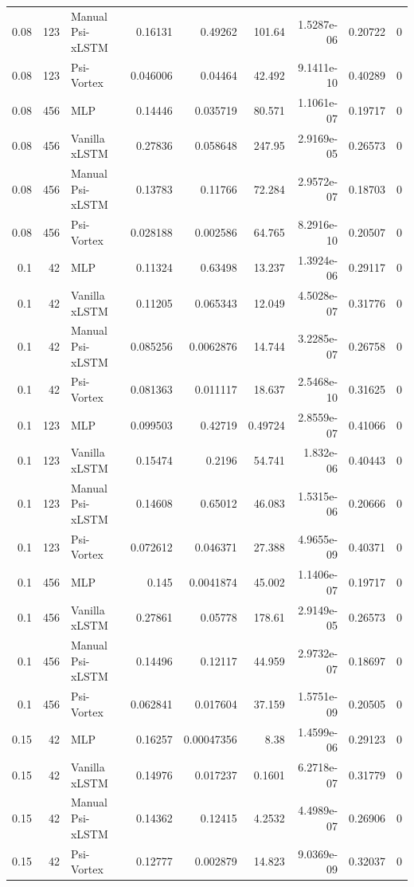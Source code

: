 \begin{tabular}{rrlrrrrrr}
0.08 & 123 & Manual Psi-xLSTM & 0.16131 & 0.49262 & 101.64 & 1.5287e-06 & 0.20722 & 0 \\
0.08 & 123 & Psi-Vortex & 0.046006 & 0.04464 & 42.492 & 9.1411e-10 & 0.40289 & 0 \\
0.08 & 456 & MLP & 0.14446 & 0.035719 & 80.571 & 1.1061e-07 & 0.19717 & 0 \\
0.08 & 456 & Vanilla xLSTM & 0.27836 & 0.058648 & 247.95 & 2.9169e-05 & 0.26573 & 0 \\
0.08 & 456 & Manual Psi-xLSTM & 0.13783 & 0.11766 & 72.284 & 2.9572e-07 & 0.18703 & 0 \\
0.08 & 456 & Psi-Vortex & 0.028188 & 0.002586 & 64.765 & 8.2916e-10 & 0.20507 & 0 \\
0.1 & 42 & MLP & 0.11324 & 0.63498 & 13.237 & 1.3924e-06 & 0.29117 & 0 \\
0.1 & 42 & Vanilla xLSTM & 0.11205 & 0.065343 & 12.049 & 4.5028e-07 & 0.31776 & 0 \\
0.1 & 42 & Manual Psi-xLSTM & 0.085256 & 0.0062876 & 14.744 & 3.2285e-07 & 0.26758 & 0 \\
0.1 & 42 & Psi-Vortex & 0.081363 & 0.011117 & 18.637 & 2.5468e-10 & 0.31625 & 0 \\
0.1 & 123 & MLP & 0.099503 & 0.42719 & 0.49724 & 2.8559e-07 & 0.41066 & 0 \\
0.1 & 123 & Vanilla xLSTM & 0.15474 & 0.2196 & 54.741 & 1.832e-06 & 0.40443 & 0 \\
0.1 & 123 & Manual Psi-xLSTM & 0.14608 & 0.65012 & 46.083 & 1.5315e-06 & 0.20666 & 0 \\
0.1 & 123 & Psi-Vortex & 0.072612 & 0.046371 & 27.388 & 4.9655e-09 & 0.40371 & 0 \\
0.1 & 456 & MLP & 0.145 & 0.0041874 & 45.002 & 1.1406e-07 & 0.19717 & 0 \\
0.1 & 456 & Vanilla xLSTM & 0.27861 & 0.05778 & 178.61 & 2.9149e-05 & 0.26573 & 0 \\
0.1 & 456 & Manual Psi-xLSTM & 0.14496 & 0.12117 & 44.959 & 2.9732e-07 & 0.18697 & 0 \\
0.1 & 456 & Psi-Vortex & 0.062841 & 0.017604 & 37.159 & 1.5751e-09 & 0.20505 & 0 \\
0.15 & 42 & MLP & 0.16257 & 0.00047356 & 8.38 & 1.4599e-06 & 0.29123 & 0 \\
0.15 & 42 & Vanilla xLSTM & 0.14976 & 0.017237 & 0.1601 & 6.2718e-07 & 0.31779 & 0 \\
0.15 & 42 & Manual Psi-xLSTM & 0.14362 & 0.12415 & 4.2532 & 4.4989e-07 & 0.26906 & 0 \\
0.15 & 42 & Psi-Vortex & 0.12777 & 0.002879 & 14.823 & 9.0369e-09 & 0.32037 & 0 \\

\end{tabular}
